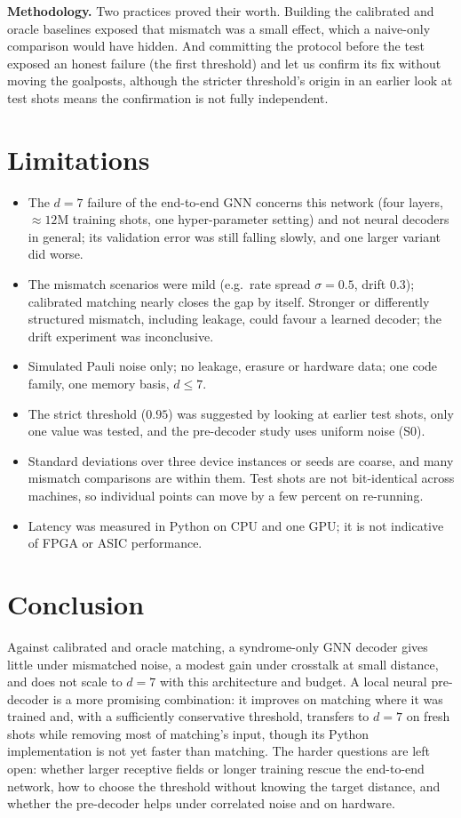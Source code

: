 \documentclass[11pt]{article}
\begin{document}
\textbf{Methodology.} Two practices proved their worth. Building the calibrated and oracle baselines exposed that mismatch was a small effect, which a naive-only comparison would have hidden. And committing the protocol before the test exposed an honest failure (the first threshold) and let us confirm its fix without moving the goalposts, although the stricter threshold's origin in an earlier look at test shots means the confirmation is not fully independent.

\section{Limitations}
\begin{itemize}
\item The $d=7$ failure of the end-to-end GNN concerns this network (four layers, $\approx12$M training shots, one hyper-parameter setting) and not neural decoders in general; its validation error was still falling slowly, and one larger variant did worse.
\item The mismatch scenarios were mild (e.g.\ rate spread $\sigma=0.5$, drift $0.3$); calibrated matching nearly closes the gap by itself. Stronger or differently structured mismatch, including leakage, could favour a learned decoder; the drift experiment was inconclusive.
\item Simulated Pauli noise only; no leakage, erasure or hardware data; one code family, one memory basis, $d\le7$.
\item The strict threshold ($0.95$) was suggested by looking at earlier test shots, only one value was tested, and the pre-decoder study uses uniform noise (S0).
\item Standard deviations over three device instances or seeds are coarse, and many mismatch comparisons are within them. Test shots are not bit-identical across machines, so individual points can move by a few percent on re-running.
\item Latency was measured in Python on CPU and one GPU; it is not indicative of FPGA or ASIC performance.
\end{itemize}

\section{Conclusion}
Against calibrated and oracle matching, a syndrome-only GNN decoder gives little under mismatched noise, a modest gain under crosstalk at small distance, and does not scale to $d=7$ with this architecture and budget. A local neural pre-decoder is a more promising combination: it improves on matching where it was trained and, with a sufficiently conservative threshold, transfers to $d=7$ on fresh shots while removing most of matching's input, though its Python implementation is not yet faster than matching. The harder questions are left open: whether larger receptive fields or longer training rescue the end-to-end network, how to choose the threshold without knowing the target distance, and whether the pre-decoder helps under correlated noise and on hardware.
\end{document}
